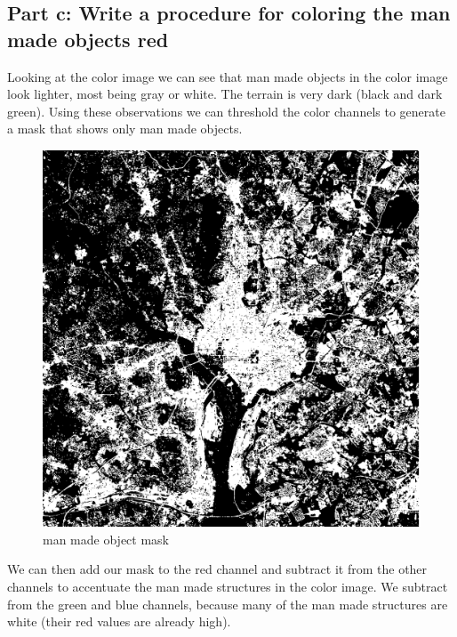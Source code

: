 \documentclass{article}
\begin{document}
	\subsection{Part c: Write a procedure for coloring the man made objects red}
	Looking at the color image we can see that man made objects in the color image look lighter, most being gray or white. The terrain is very dark (black and dark green). Using these observations we can threshold the color channels to generate a mask that shows only man made objects.
	\begin{figure}[H]
		\includegraphics[width=\linewidth]{6.17/partC/buildings.png}
		\caption{man made object mask}
	\end{figure}
	We can then add our mask to the red channel and subtract it from the other channels to accentuate the man made structures in the color image. We subtract from the green and blue channels, because many of the man made structures are white (their red values are already high).
\end{document}
